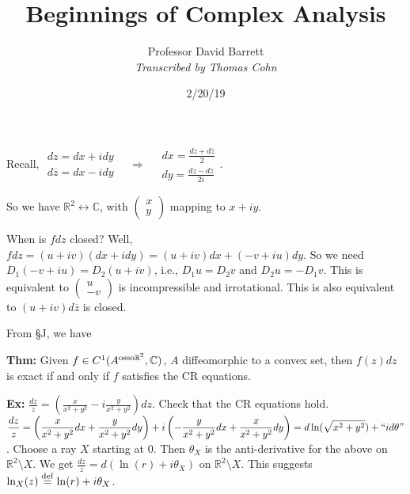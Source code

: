 \documentclass[10pt,letterpaper]{article}
\author{Professor David Barrett\\ \small\textit{Transcribed by Thomas Cohn}}
\title{Beginnings of Complex Analysis}
\date{2/20/19} %
\newcommand{\n}{\hfill\break}
\newcommand{\thm}[1]{\par\noindent\settowidth{\hangindent}{\textbf{Thm: }}\textbf{Thm: }#1\n}
\newcommand{\ex}[1]{\par\noindent\settowidth{\hangindent}{\textbf{Ex: }}\textbf{Ex: }#1\n}
\newcommand{\ptxt}[1]{\textrm{\textnormal{#1}}}
\newcommand{\reals}{\mathbb{R}}
\newcommand{\R}{\reals}
\newcommand{\complex}{\mathbb{C}}
\newcommand{\C}{\complex}
\newcommand{\cut}{\setminus}
\newcommand{\conj}[1]{\overline{#1}}
\newcommand{\eqdef}{\overset{\ptxt{def}}{=}}
\newcommand{\paren}[1]{\left(#1\right)}
\begin{document}
\maketitle
\setlength\RaggedRightParindent{\parindent}
\RaggedRight

\par\noindent Recall, $\begin{array}{r}dz=dx+idy\\ d\conj{z}=dx-idy\end{array}\quad\Rightarrow\quad\begin{array}{l}dx=\frac{dz+d\conj{z}}{2}\\ dy=\frac{dz-d\conj{z}}{2i}\end{array}$.\n


\par\noindent So we have $\R^{2}\leftrightarrow\C$, with $\paren{\begin{array}{c}x\\ y\end{array}}$ mapping to $x+iy$.\n

\par\noindent When is $fdz$ closed? Well, $fdz=(u+iv)(dx+idy)=(u+iv)dx+(-v+iu)dy$.\n
So we need $D_{1}(-v+iu)=D_{2}(u+iv)$, i.e., $D_{1}u=D_{2}v$ and $D_{2}u=-D_{1}v$.\n
This is equivalent to $\paren{\begin{array}{c}u\\ -v\end{array}}$ is incompressible and irrotational.\n
This is also equivalent to $(u+iv)d\conj{z}$ is closed.\n

\par\noindent From \S{}J, we have
\thm{Given $f\in{}C^{1}(A^{\ptxt{osso}\R^{2}},\C)$, $A$ diffeomorphic to a convex set, then $f(z)dz$ is exact if and only if $f$ satisfies the CR equations.}

\ex{$\displaystyle\frac{dz}{z}=\paren{\frac{x}{x^{2}+y^{2}}-i\frac{y}{x^{2}+y^{2}}}dz$. Check that the CR equations hold.\n
$\displaystyle\frac{dz}{z}=\paren{\frac{x}{x^{2}+y^{2}}dx+\frac{y}{x^{2}+y^{2}}dy}+i\paren{-\frac{y}{x^{2}+y^{2}}dx+\frac{x}{x^{2}+y^{2}}dy}=d\ln(\sqrt{x^{2}+y^{2}})+``id\theta"$.\n
Choose a ray $X$ starting at $0$. Then $\theta_{X}$ is the anti-derivative for the above on $\R^{2}\cut{}X$.\n
We get $\frac{dz}{z}=d(\ln(r)+i\theta_{X})$ on $\R^{2}\cut{}X$.\n
This suggests $\ln_{X}(z)\eqdef\ln(r)+i\theta_{X}$.}
\end{document}
